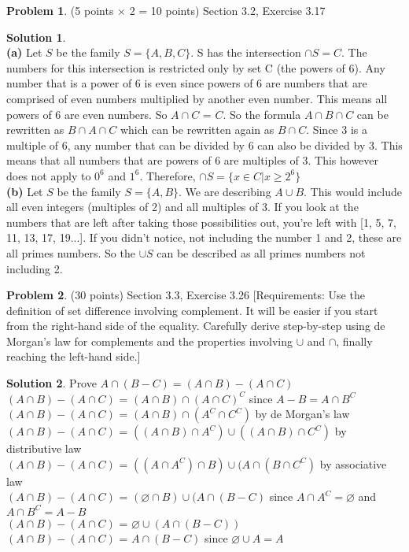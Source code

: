 \documentclass{article}
\theoremstyle{definition}
\newtheorem{problem}{Problem}
\newtheorem*{solution}{Solution}
\begin{document}
\begin{problem} (5 points $\times$ 2 = 10 points) Section 3.2, Exercise 3.17
\end{problem}
\begin{solution} 
\ \\
\textbf{(a)}
Let $S$ be the family $S = \{ A,B,C \}$. S has the intersection $\cap S = C$. The numbers for this intersection is restricted only by set C (the powers of 6). Any number that is a power of 6 is even since powers of 6 are numbers that are comprised of even numbers multiplied by another even number. This means all powers of 6 are even numbers. So $A \cap C$ = $C$. So the formula $A \cap B \cap C$ can be rewritten as $B \cap A \cap C$ which can be rewritten again as $B \cap C$. Since 3 is a multiple of 6, any number that can be divided by 6 can also be divided by 3. This means that all numbers that are powers of 6 are multiples of 3. This however does not apply to $0^6$ and $1^6$. Therefore, $\cap S = \{ x \in C | x \geqslant 2^6\}$
\ \\[2ex]
\textbf{(b)}
Let $S$ be the family $S = \{ A,B \}$. We are describing $A \cup B$. This would include all even integers (multiples of 2) and all multiples of 3. If you look at the numbers that are left after taking those possibilities out, you're left with [1, 5, 7, 11, 13, 17, 19...]. If you didn't notice, not including the number 1 and 2, these are all primes numbers. So the $\cup S$ can be described as all primes numbers not including 2.
\end{solution}

\begin{problem} (30 points) Section 3.3, Exercise 3.26 
[Requirements: Use the definition of set difference involving complement. It will be easier 
if you start from the right-hand side of the equality.  Carefully derive step-by-step using 
de Morgan's law for complements and the properties involving $\cup$ and $\cap$, 
finally reaching the left-hand side.]
\end{problem}
\begin{solution} 
Prove $A \cap (B - C) = (A \cap B) - (A \cap C)$ \\
$(A \cap B) - (A \cap C)$ = $(A \cap B) \cap (A \cap C)^C$ since $A - B = A \cap B^C$ \\
$(A \cap B) - (A \cap C)$ = $(A \cap B) \cap (A^C \cap C^C)$ by de Morgan's law \\
$(A \cap B) - (A \cap C)$ = $((A \cap B) \cap A^C) \cup ((A \cap B) \cap C^C)$ by distributive law \\
$(A \cap B) - (A \cap C)$ = $((A \cap A^C) \cap B) \cup (A \cap (B \cap C^C)$ by associative law \\
$(A \cap B) - (A \cap C)$ = $(\varnothing \cap B) \cup (A \cap (B - C)$ since $A \cap A^C = \varnothing$ and $A \cap B^C = A - B$ \\
$(A \cap B) - (A \cap C)$ = $\varnothing \cup (A \cap (B - C))$ \\
$(A \cap B) - (A \cap C)$ = $A \cap (B - C)$ since $\varnothing \cup A = A$

\end{solution}
\end{document}
